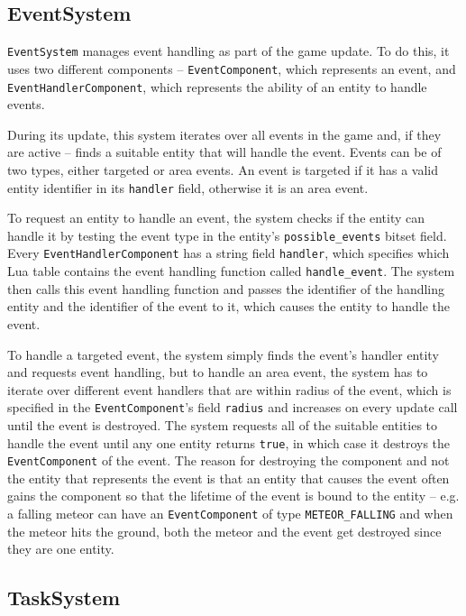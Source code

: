 \subsection{EventSystem}

\texttt{EventSystem} manages event handling as part of the game update. To do this, it uses two different components --
\texttt{EventComponent}, which represents an event, and \texttt{EventHandlerComponent}, which represents the ability of an entity
to handle events.

During its update, this system iterates over all events in the game and, if they are active -- finds a suitable entity that will
handle the event. Events can be of two types, either targeted or area events. An event is targeted if it has a valid entity
identifier in its \texttt{handler} field, otherwise it is an area event.

To request an entity to handle an event, the system checks if the entity can handle it by testing the event type in the entity's
\texttt{possible\_events} bitset field. Every \texttt{EventHandlerComponent} has a string field \texttt{handler}, which specifies
which Lua table contains the event handling function called \texttt{handle\_event}. The system then calls this event handling
function and passes the identifier of the handling entity and the identifier of the event to it, which causes the entity
to handle the event.

To handle a targeted event, the system simply finds the event's handler entity and requests event handling, but to handle an area event,
the system has to iterate over different event handlers that are within radius of the event, which is specified in the
\texttt{EventComponent}'s field \texttt{radius} and increases on every update call until the event is destroyed. The system requests
all of the suitable entities to handle the event until any one entity returns \texttt{true}, in which case it destroys the
\texttt{EventComponent} of the event. The reason for destroying the component and not the entity that represents the event is that
an entity that causes the event often gains the component so that the lifetime of the event is bound to the entity -- e.g. a falling
meteor can have an \texttt{EventComponent} of type \texttt{METEOR\_FALLING} and when the meteor hits the ground, both the meteor and
the event get destroyed since they are one entity.

\subsection{TaskSystem}

